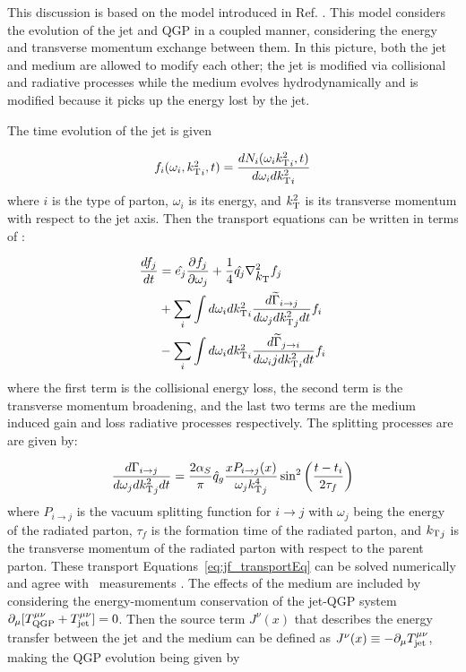 
This discussion is based on the model introduced in Ref. \cite{Tachibana:2017syd}. This model considers the evolution of the jet and QGP in a coupled manner, considering the energy and transverse momentum exchange between them. In this picture, both the jet and medium are allowed to modify each other; the jet is modified via collisional and radiative processes while the medium evolves hydrodynamically and is modified because it picks up the energy lost by the jet. 

The time evolution of the jet is given 

\begin{align}
f_i (\omega_i, \mbox{$k_{\rm T}^2$}_i, t) = \frac{dN_i (\omega_i \mbox{$k_{\rm T}^2$}_i, t)}{d \omega_i d\mbox{$k_{\rm T}^2$}_i}
\end{align}
where $i$ is the type of parton, $\omega_i$ is its energy, and $\mbox{$k_{\rm T}^2$}$ is its transverse momentum with respect to the jet axis. Then the transport equations can be written in terms of :

\begin{align}
\label{eq:jf_transportEq}
\frac{d f_j}{dt} &= \hat{e_j} \frac{\partial f_j}{\partial \omega_j} + \frac{1}{4} \hat{q_j} \nabla_{\mbox{$k_{\rm T}$}}^2 f_j  \\
& + \sum_i \int d\omega_i d\mbox{$k_{\rm T}^2$}_i \frac{d\widetilde{\Gamma}_{i\rightarrow j} }{d\omega_j d\mbox{$k_{\rm T}^2$}_j dt} f_i \\
& - \sum_i \int d\omega_i d\mbox{$k_{\rm T}^2$}_i \frac{d\widetilde{\Gamma}_{j\rightarrow i} }{d\omega_ij d\mbox{$k_{\rm T}^2$}_i dt} f_i \\
\end{align}
where the first term is the collisional energy loss, the second term is the transverse momentum broadening, and the last two terms are the medium induced gain and loss radiative processes respectively. The splitting processes are are given by:

\begin{align}
\frac{d\Gamma_{i \rightarrow j}}{d \omega_j d\mbox{$k_{\rm T}^2$}_j dt} = \frac{2\alpha_S}{\pi} \hat{q}_g \frac{x P_{i \rightarrow j} (x)}{\omega_j {k_{\rm T}^4}_j} \sin^2 \left(\dfrac{t - t_i}{2\tau_f} \right)
\end{align}
where $P_{i \rightarrow j} $ is the vacuum splitting function for $i \rightarrow j $ with $\omega_j$ being the energy of the radiated parton, $\tau_f$ is the formation time of the radiated parton, and $\mbox{$k_{\rm T}$}_j$ is the transverse momentum of the radiated parton with respect to the parent parton. These transport Equations~\ref{eq:jf_transportEq} can be solved numerically and agree with \RAA\ measurements \cite{Aad:2014bxa, Khachatryan:2016jfl, Abelev:2013kqa}. The effects of the medium are included by considering the energy-momentum conservation of the jet-QGP system $ \partial_\mu [T_{\rm QGP}^{\mu\nu} + T_{\rm jet}^{\mu\nu}] = 0$. Then the source term $J^\nu(x)$ that describes the energy transfer between the jet and the medium can be defined as $J^\nu(x) \equiv -\partial_\mu  T_{\rm jet}^{\mu\nu}$, making the QGP evolution being given by

